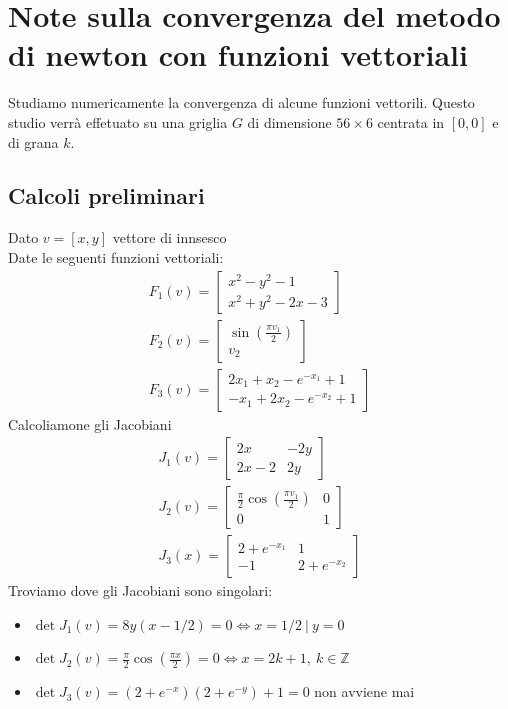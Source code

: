 \documentclass[12pt]{article}
\begin{document}
\section*{Note sulla convergenza del metodo di newton con funzioni vettoriali}
Studiamo numericamente la convergenza di alcune funzioni vettorili. Questo studio verrà effetuato su una griglia $G$ di dimensione $56\times 6$ centrata in $[0,0]$ e di grana $k$.

\subsection{Calcoli preliminari}
Dato $v=[x,y]$ vettore di innsesco\\
Date le seguenti funzioni vettoriali:
\begin{gather}
	F_1(v) = 
	\begin{bmatrix}
		x^2-y^2-1\\
		x^2+y^2-2x-3
	\end{bmatrix}\label{F1}\\
	F_2(v)=
	\begin{bmatrix}
		\sin\left(\frac{\pi v_1}{2}\right)\\
		v_2
	\end{bmatrix}\label{F2}\\
	F_3(v) =
	\begin{bmatrix}
		2x_1+x_2-e^{-x_1}+1\\
		-x_1+2x_2-e^{-x_2}+1
	\end{bmatrix}\label{F3}
\end{gather}
Calcoliamone gli Jacobiani
\begin{gather*}
	J_1(v)=
	\begin{bmatrix}
		2x & -2y\\
		2x-2 & 2y
	\end{bmatrix}\\
	J_2(v)=
	\begin{bmatrix}
		\frac{\pi}{2}\cos\left(\frac{\pi v_1}{2}\right) & 0\\
		0 & 1
	\end{bmatrix}\\
	J_3(x)=
	\begin{bmatrix}
		2+e^{-x_1} & 1\\
		-1 & 2+e^{-x_2}
	\end{bmatrix}
\end{gather*}
Troviamo dove gli Jacobiani sono singolari:
\begin{itemize}
	\item $\det J_1(v) = 8y(x-1/2) = 0\iff x=1/2\ |\ y=0$
	\item $\det J_2(v) = \frac{\pi}{2}\cos\left(\frac{\pi x}{2}\right)=0 \iff x=2k+1,\ k\in\mathbb{Z}$
	\item $\det J_3(v) = (2+e^{-x})(2+e^{-y})+1 = 0$ non avviene mai
\end{itemize}
\end{document}
